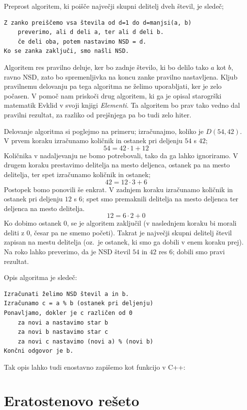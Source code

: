 Preprost algoritem, ki poišče največji skupni delitelj dveh števil, je sledeč;
\begin{verbatim}
Z zanko preiščemo vsa števila od d=1 do d=manjsi(a, b)
    preverimo, ali d deli a, ter ali d deli b.
    če deli oba, potem nastavimo NSD = d.
Ko se zanka zaključi, smo našli NSD.
\end{verbatim}
Algoritem res pravilno deluje, ker bo zadnje število, ki bo delilo tako $a$ kot
$b$, ravno NSD, zato bo spremenljivka na koncu zanke pravilno nastavljena.
Kljub pravilnemu delovanju pa tega algoritma ne želimo uporabljati, ker je zelo
počasen.
V pomoč nam priskoči drug algoritem, ki ga je opisal starogrški matematik Evklid
v svoji knjigi \emph{Elementi}.
Ta algoritem bo prav tako vedno dal pravilni rezultat, za razliko od prejšnjega
pa bo tudi zelo hiter.
\begin{examples}
  Delovanje algoritma si poglejmo na primeru; izračunajmo, koliko je $D(54,
  42)$.
  V prvem koraku izračunamo količnik in ostanek pri deljenju $54$ s $42$;
  \[
	54 = 42 \cdot 1 + 12
  \]
  Količnika v nadaljevanju ne bomo potrebovali, tako da ga lahko ignoriramo.
  V drugem koraku prestavimo delitelja na mesto deljenca, ostanek pa na mesto
  delitelja, ter spet izračunamo količnik in ostanek;
  \[
	42 = 12 \cdot 3 + 6
  \]
  Postopek bomo ponovili še enkrat.
  V zadnjem koraku izračunamo količnik in ostanek pri deljenju $12$ s $6$; spet
  smo premaknili delitelja na mesto deljenca ter deljenca na mesto delitelja.
  \[
	12 = 6 \cdot 2 + 0
  \]
  Ko dobimo ostanek $0$, se je algoritem zaključil (v naslednjem koraku bi
  morali deliti z $0$, česar pa ne smemo početi).
  Takrat je največji skupni delitelj števil zapisan na mestu delitelja
  (oz.~je ostanek, ki smo ga dobili v enem koraku prej).
  Na roko lahko preverimo, da je NSD števil $54$ in $42$ res $6$; dobili smo
  pravi rezultat.
\end{examples}

Opis algoritma je sledeč:
\begin{verbatim}
Izračunati želimo NSD števil a in b.
Izračunamo c = a % b (ostanek pri deljenju)
Ponavljamo, dokler je c različen od 0
    za novi a nastavimo star b
    za novi b nastavimo star c
    za novi c nastavimo (novi a) % (novi b)
Končni odgovor je b.
\end{verbatim}
Tak opis lahko tudi enostavno zapišemo kot funkcijo v C++:

\section{Eratostenovo rešeto}

